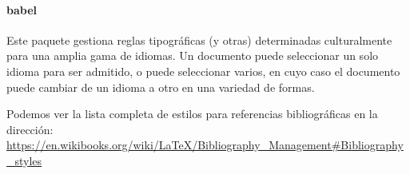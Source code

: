 \documentclass[12pt,letterpaper]{article}
\begin{document}
\paragraph{babel} Este paquete gestiona reglas tipográficas (y otras) determinadas culturalmente para una amplia gama de idiomas. Un documento puede seleccionar un solo idioma para ser admitido, o puede seleccionar varios, en cuyo caso el documento puede cambiar de un idioma a otro en una variedad de formas.





\vspace{0.5cm}
Podemos ver la lista completa de estilos para referencias bibliográficas en la dirección: \url{https://en.wikibooks.org/wiki/LaTeX/Bibliography_Management#Bibliography_styles}
\end{document}
